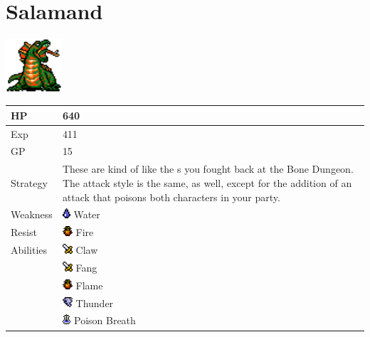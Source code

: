 \section{Salamand}
\label{monster:salamand}

\includegraphics[height=2cm,keepaspectratio]{./resources/monster/salamand}

\begin{longtable}{ l p{9cm} }
	HP
	& 640
\\ \hline
	Exp
	& 411
\\ \hline
	GP
	& 15
\\ \hline
	Strategy
	& These are kind of like the \nameref{monster:basilisk}s you fought back at the Bone Dungeon. The attack style is the same, as well, except for the addition of an attack that poisons both characters in your party.
\\ \hline
	Weakness
	& \includegraphics[height=1em,keepaspectratio]{./resources/effects/water} Water
\\ \hline
	Resist
	& \includegraphics[height=1em,keepaspectratio]{./resources/effects/fire} Fire
\\ \hline
	Abilities
	& \includegraphics[height=1em,keepaspectratio]{./resources/effects/damage} Claw \\
	& \includegraphics[height=1em,keepaspectratio]{./resources/effects/damage} Fang \\
	& \includegraphics[height=1em,keepaspectratio]{./resources/effects/fire} Flame \\
	& \includegraphics[height=1em,keepaspectratio]{./resources/effects/wind} Thunder \\
	& \includegraphics[height=1em,keepaspectratio]{./resources/effects/poison} Poison Breath
\end{longtable}
